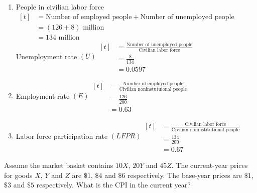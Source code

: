 \documentclass[12pt]{article}
\begin{document}
\begin{soln}
	\begin{enumerate}[label=(\alph*)]
		\item People in civilian labor force $\begin{aligned}[t]
				       & = \text{Number of employed people} + \text{Number of unemployed people} \\
				       & = (126+8) \text{ million}                                               \\
				       & = 134 \text{ million}
			      \end{aligned}
		      $\\
		      Unemployment rate $ (U)\begin{aligned}[t]
				       & = \frac{\text{Number of unemployed people}}{\text{Civilian labor force}} \\
				       & = \frac{8}{134}                                                          \\
				       & = 0.0597
			      \end{aligned}
		      $\\
		\item Employment rate $ (E)\begin{aligned}[t]
				       & = \frac{\text{Number of employed people}}{\text{Civilian noninstutuional people}} \\
				       & = \frac{126}{200}                                                                 \\
				       & = 0.63
			      \end{aligned}
		      $
		\item Labor force participation rate $ (LFPR) \begin{aligned}[t]
				       & =\frac{\text{Civilian labor force}}{\text{Civilian noninstitutional people}} \\
				       & =\frac{134}{200}                                                             \\
				       & =0.67
			      \end{aligned} $
	\end{enumerate}
\end{soln}
\newpage
\begin{prob}
	Assume the market basket contains $ 10X $, $ 20Y $ and $ 45Z $. The current-year prices for goods $ X $, $ Y $ and $ Z $ are $ \$1 $, $ \$4 $ and $ \$6 $ respectively. The base-year prices are $ \$1 $, $ \$3 $ and $ \$5 $ respectively. What is the CPI in the current year?
\end{prob}
\end{document}
